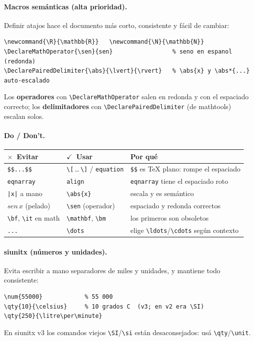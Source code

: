 \documentclass[11pt,a4paper]{article}
\newcommand{\C}[1]{\texttt{\textbackslash #1}}
\newcommand{\pkg}[1]{\textsf{#1}}
\newcommand{\si}{\textcolor{okgreen}{\boldmath$\checkmark$}}
\newcommand{\no}{\textcolor{badred}{\boldmath$\times$}}
\begin{document}
\paragraph{Macros semánticas (alta prioridad).} Definir atajos hace el documento
más corto, consistente y fácil de cambiar:
\begin{lstlisting}
\newcommand{\R}{\mathbb{R}}   \newcommand{\N}{\mathbb{N}}
\DeclareMathOperator{\sen}{sen}                 % seno en espanol (redonda)
\DeclarePairedDelimiter{\abs}{\lvert}{\rvert}   % \abs{x} y \abs*{...} auto-escalado
\end{lstlisting}
Los \textbf{operadores} con \C{DeclareMathOperator} salen en redonda y con el
espaciado correcto; los \textbf{delimitadores} con \C{DeclarePairedDelimiter}
(de \pkg{mathtools}) escalan solos.

\paragraph{Do / Don't.}
\begin{center}\small
\renewcommand{\arraystretch}{1.3}
\begin{tabularx}{\linewidth}{@{}l l X@{}}
\toprule
\textbf{\no\ Evitar} & \textbf{\si\ Usar} & \textbf{Por qué} \\
\midrule
\verb|$$...$$| & \C{[}\,\dots\,\C{]} / \texttt{equation} & \verb|$$| es TeX plano: rompe el espaciado \\
\texttt{eqnarray} & \texttt{align} & \texttt{eqnarray} tiene el espaciado roto \\
\verb;|x|; a mano & \C{abs\{x\}} & escala y es semántico \\
$sen\,x$ (pelado) & \C{sen} (operador) & espaciado y redonda correctos \\
\C{bf}, \C{it} en math & \C{mathbf}, \C{bm} & los primeros son obsoletos \\
\texttt{...} & \C{dots} & elige \texttt{\textbackslash ldots}/\texttt{\textbackslash cdots} según contexto \\
\bottomrule
\end{tabularx}
\end{center}

\paragraph{\pkg{siunitx} (números y unidades).} Evita escribir a mano separadores
de miles y unidades, y mantiene todo consistente:
\begin{lstlisting}
\num{55000}            % 55 000
\qty{10}{\celsius}     % 10 grados C  (v3; en v2 era \SI)
\qty{250}{\litre\per\minute}
\end{lstlisting}
En \pkg{siunitx} v3 los comandos viejos \C{SI}/\C{si} están desaconsejados: usá
\C{qty}/\C{unit}.
\end{document}
